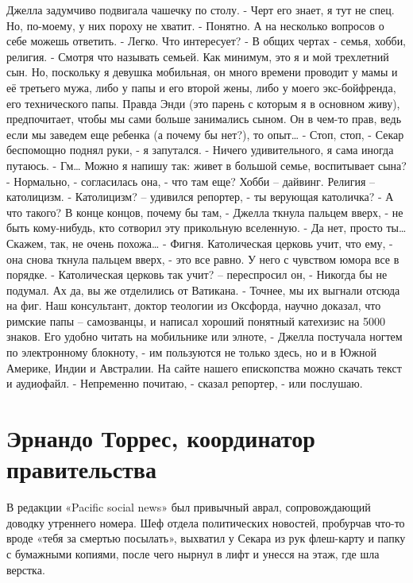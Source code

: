\documentclass[10pt,final]{book}
\begin{document}
Джелла задумчиво подвигала чашечку по столу.
- Черт его знает, я тут не спец. Но, по-моему, у них пороху не хватит.
- Понятно. А на несколько вопросов о себе можешь ответить.
- Легко. Что интересует?
- В общих чертах - семья, хобби, религия.
- Смотря что называть семьей. Как минимум, это я и мой трехлетний сын. Но, поскольку я девушка мобильная, он много времени проводит у мамы и её третьего мужа, либо у папы и его второй жены, либо у моего экс-бойфренда, его технического папы. Правда Энди (это парень с которым я в основном живу), предпочитает, чтобы мы сами больше занимались сыном. Он в чем-то прав, ведь если мы заведем еще ребенка (а почему бы нет?), то опыт\ldots{}
- Стоп, стоп, - Секар беспомощно поднял руки, - я запутался.
- Ничего удивительного, я сама иногда путаюсь.
- Гм\ldots{} Можно я напишу так: живет в большой семье, воспитывает сына?
- Нормально, - согласилась она, - что там еще? Хобби -- дайвинг. Религия -- католицизм.
- Католицизм? -- удивился репортер, - ты верующая католичка?
- А что такого? В конце концов, почему бы там, - Джелла ткнула пальцем вверх, - не быть кому-нибудь, кто сотворил эту прикольную вселенную.
- Да нет, просто ты\ldots{} Скажем, так, не очень похожа\ldots{}
- Фигня. Католическая церковь учит, что ему, - она снова ткнула пальцем вверх, - это все равно. У него с чувством юмора все в порядке.
- Католическая церковь так учит? -- переспросил он, - Никогда бы не подумал. Ах да, вы же отделились от Ватикана.
- Точнее, мы их выгнали отсюда на фиг. Наш консультант, доктор теологии из Оксфорда, научно доказал, что римские папы -- самозванцы, и написал хороший понятный катехизис на 5000 знаков. Его удобно читать на мобильнике или элноте, - Джелла постучала ногтем по электронному блокноту, - им пользуются не только здесь, но и в Южной Америке, Индии и Австралии. На сайте нашего епископства можно скачать текст и аудиофайл.
- Непременно почитаю, - сказал репортер, - или послушаю.



\chapter{Эрнандо Торрес, координатор правительства}


В редакции «Pacific social news» был привычный аврал, сопровождающий доводку утреннего номера. Шеф отдела политических новостей, пробурчав что-то вроде «тебя за смертью посылать», выхватил у Секара из рук флеш-карту и папку с бумажными копиями, после чего нырнул в лифт и унесся на этаж, где шла верстка.
\end{document}

